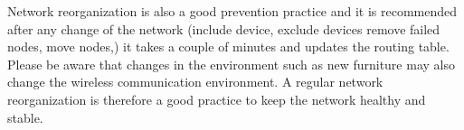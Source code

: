 Network reorganization is also a good prevention practice and it is recommended after any change of the network (include device, exclude devices remove 
 failed nodes, move nodes,) it takes a couple of minutes and updates the routing table. Please be aware that changes in the environment such as new furniture
may also change the wireless communication environment. A regular network reorganization is therefore a good practice to keep the network healthy and stable.
